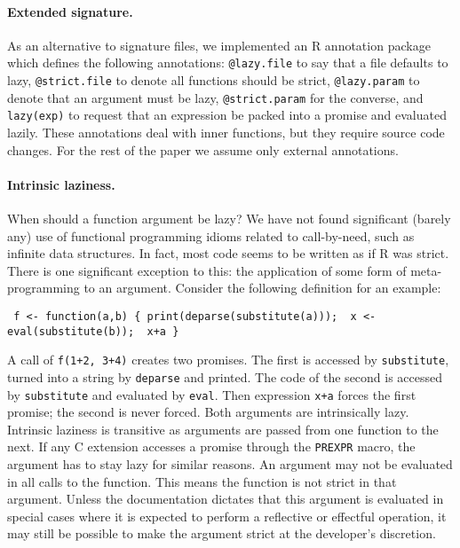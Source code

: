 \documentclass[review,creen,acmsmall]{acmart}
\newcommand{\code}[1]{\lstinline |#1|\xspace}
\renewcommand{\c}[1]{\lstinline |#1|\xspace}
\begin{document}
\paragraph{Extended signature.}
As an alternative to signature files, we implemented an R annotation package
which defines the following annotations: \c{@lazy.file} to say that a
file defaults to lazy, \c{@strict.file} to denote all functions should be
strict, \c{@lazy.param} to denote that an argument must be lazy,
\c{@strict.param} for the converse, and \c{lazy(exp)} to request that an
expression be packed into a promise and evaluated lazily. These annotations deal
with inner functions, but they require source code changes. For the rest of the
paper we assume only external annotations.

\paragraph{Intrinsic laziness.} When should a function argument be lazy?
We have not found significant (barely any) use of functional programming idioms
related to call-by-need, such as infinite data structures. In fact, most code
seems to be written as if R was strict. There is one significant exception to
this: the application of some form of meta-programming to an argument.
Consider the following definition for an example:
\begin{lstlisting}
 f <- function(a,b) { print(deparse(substitute(a)));  x <- eval(substitute(b));  x+a }
\end{lstlisting}

\medskip
\noindent
A call of \c{f(1+2, 3+4)} creates two promises. The first is accessed by
\c{substitute}, turned into a string by \c{deparse} and printed. The code of the
second is accessed by \c{substitute} and evaluated by \c{eval}. Then expression
\c{x+a} forces the first promise; the second is never forced. Both arguments are
intrinsically lazy. Intrinsic laziness is transitive as arguments are passed
from one function to the next. If any C extension accesses a promise through the
\code{PREXPR} macro, the argument has to stay lazy for similar reasons. An
argument may not be evaluated in all calls to the function. This means the
function is not strict in that argument. Unless the documentation dictates that
this argument is evaluated in special cases where it is expected to perform a
reflective or effectful operation, it may still be possible to make the argument
strict at the developer's discretion.
\end{document}
